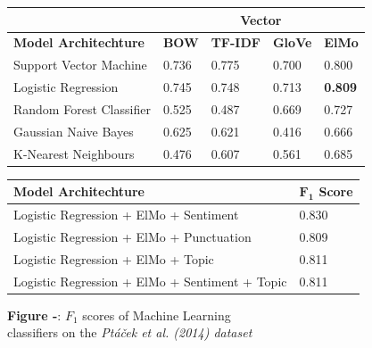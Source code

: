 \documentclass[12pt,a4paper]{article}
\begin{document}
\begin{center}
	\begin{tabular}{ |p{4.7cm}||p{1.2cm}|p{1.5cm}|p{1.2cm}|p{1.2cm}|  }
		\hline
		  & \multicolumn{4}{|c|}{\textbf{Vector}} \\
		\hline
		\textbf{Model Architechture}& \textbf{BOW} & \textbf{TF-IDF} & \textbf{GloVe} & \textbf{ElMo}\\
		\hline\hline
		Support Vector Machine   & 0.736    & 0.775 &   0.700 & 0.800\\
		Logistic Regression &   0.745 & 0.748   & 0.713 & \textbf{0.809}\\
		Random Forest Classifier &0.525 & 0.487 &  0.669 & 0.727\\
		Gaussian Naive Bayes  & 0.625  & 0.621 &  0.416 & 0.666\\
		K-Nearest Neighbours & 0.476  & 0.607   & 0.561 & 0.685\\
		\hline
	\end{tabular}
\end{center}

\begin{center}
	\begin{tabular}{ |p{9cm}||p{2cm}|}
		\hline
		\textbf{Model Architechture}&  \textbf{$\mathbf{F_1}$ Score}\\
		\hline\hline
		Logistic Regression + ElMo + Sentiment   & 0.830\\
		Logistic Regression + ElMo + Punctuation & 0.809\\
		Logistic Regression + ElMo + Topic   & 0.811\\
		Logistic Regression + ElMo + Sentiment + Topic & 0.811\\
		\hline
	\end{tabular}
\end{center}


\begin{center}
	\textbf{Figure -}: $F_1$ scores of Machine Learning\\ classifiers on the \textit{Pt\'a\v{c}ek et al. (2014) dataset}
\end{center}
\end{document}
